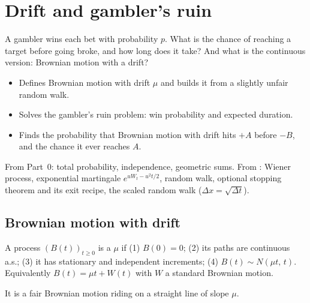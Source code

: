 \chapter{Drift and gambler's ruin}
\label{ch:drift}

\begin{question}
A gambler wins each bet with probability $p$. What is the chance of reaching a target before going broke, and how long does it take? And what is the continuous version: Brownian motion with a drift?
\end{question}

\begin{whatfor}
\begin{itemize}
  \item Defines Brownian motion with drift $\mu$ and builds it from a slightly unfair random walk.
  \item Solves the gambler's ruin problem: win probability and expected duration.
  \item Finds the probability that Brownian motion with drift hits $+A$ before $-B$, and the chance it ever reaches $A$.
\end{itemize}
\end{whatfor}

\begin{prereq}
From Part~0: total probability, independence, geometric sums. From : Wiener process, exponential martingale $e^{uW_t-u^2t/2}$, random walk, optional stopping theorem and its exit recipe, the scaled random walk ($\Delta x=\sqrt{\Delta t}$).
\end{prereq}

\section{Brownian motion with drift}

\begin{definition}
\label{def:drift}
A process $(B(t))_{t\ge0}$ is a  $\mu$ if (1) $B(0)=0$; (2) its paths are continuous a.s.; (3) it has stationary and independent increments; (4) $B(t)\sim N(\mu t,\,t)$. Equivalently $B(t)=\mu t+W(t)$ with $W$ a standard Brownian motion.
\end{definition}

It is a fair Brownian motion riding on a straight line of slope $\mu$.

